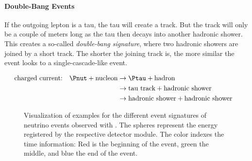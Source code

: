\paragraph{Double-Bang Events}
If the outgoing lepton is a tau, the tau will create a track. But the track will only be a couple of meters long as the tau then decays into another hadronic shower. This creates a so-called \textit{double-bang signature}, where two hadronic showers are joined by a short track. The shorter the joining track is, the more similar the event looks to a single-cascade-like event. \cite{skysearch, energyreco, particledatareview}

\begin{align*}
  & \text{charged current:} & \Pnut + \text{nucleon}      & \rightarrow \Ptau + \text{hadron}                                   & \\
  &                         &                             & \rightarrow \text{tau track} + \text{hadronic shower}               & \\
  &                         &                             & \rightarrow \text{hadronic shower} + \text{hadronic shower}         & \\
\end{align*}

\begin{figure}[htbp]
  \centering
  \hfill
  \hfill
  \hfill
  \caption{Visualization of examples for the different event signatures of neutrino events observed with \icecube. The spheres represent the energy registered by the respective detector module. The color indexes the time information: Red is the beginning of the event, green the middle, and blue the end of the event.}
  \label{fig:eeQuaef6}
\end{figure}



